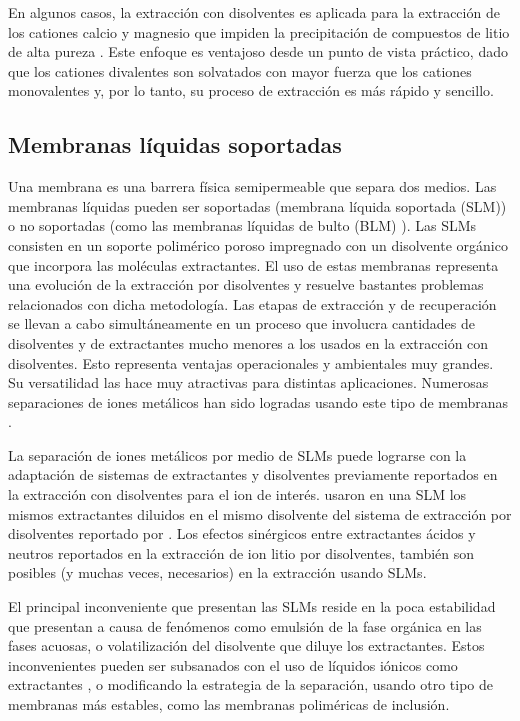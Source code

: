 En algunos casos, la extracción con disolventes es aplicada para la extracción de los cationes calcio y magnesio que impiden la precipitación de compuestos de litio de alta pureza \citep{Shi2020b}. Este enfoque es ventajoso desde un punto de vista práctico, dado que los cationes divalentes son solvatados con mayor fuerza que los cationes monovalentes y, por lo tanto, su proceso de extracción es más rápido y sencillo.

\subsection{Membranas líquidas soportadas}
Una membrana es una barrera física semipermeable que separa dos medios. Las membranas líquidas pueden ser soportadas (membrana líquida soportada (SLM)) o no soportadas (como las membranas líquidas de bulto (BLM) ). Las \ac{SLM}s consisten en un soporte polimérico poroso impregnado con un disolvente orgánico que incorpora las moléculas extractantes. El uso de estas membranas representa una evolución de la extracción por disolventes y resuelve bastantes problemas relacionados con dicha metodología. Las etapas de extracción y de recuperación se llevan a cabo simultáneamente en un proceso que involucra cantidades de disolventes y de extractantes mucho menores a los usados en la extracción con disolventes. Esto representa ventajas operacionales y ambientales muy grandes. Su versatilidad las hace muy atractivas para distintas aplicaciones. Numerosas separaciones de iones metálicos han sido logradas usando este tipo de membranas \citep{deGyves1999}.

La separación de iones metálicos por medio de \ac{SLM}s puede lograrse con la adaptación de sistemas de extractantes y disolventes previamente reportados en la extracción con disolventes para el ion de interés. \citet{Ma2000} usaron en una \ac{SLM} los mismos extractantes diluidos en el mismo disolvente del sistema de extracción por disolventes reportado por \citet{Kunugita1989}. Los efectos sinérgicos entre extractantes ácidos y neutros reportados en la extracción de ion litio por disolventes, también son posibles (y muchas veces, necesarios) en la extracción usando \ac{SLM}s.

El principal inconveniente que presentan las \ac{SLM}s reside en la poca estabilidad que presentan a causa de fenómenos como emulsión de la fase orgánica en las fases acuosas, o volatilización del disolvente que diluye los extractantes. Estos inconvenientes pueden ser subsanados con el uso de líquidos iónicos como extractantes \citep{ZANTE2019}, o modificando la estrategia de la separación, usando otro tipo de membranas más estables, como las membranas poliméricas de inclusión.

